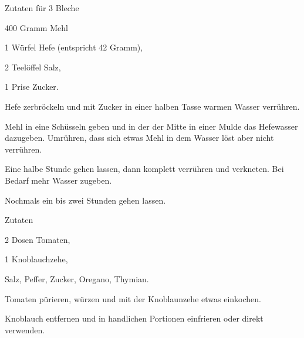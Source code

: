 \startsection[title={Pizza},reference=pizza]

\startsubsection[title=Teig]
\startitemize
\item Zutaten für 3 Bleche
      \startitemize
      \item 400 Gramm Mehl
      \item 1 Würfel Hefe (entspricht 42 Gramm),
      \item 2 Teelöffel Salz,
      \item 1 Prise Zucker.
      \stopitemize
\item Hefe zerbröckeln und mit Zucker in einer halben Tasse warmen
  Wasser verrühren.
\item Mehl in eine Schüsseln geben und in der der Mitte in einer Mulde
  das Hefewasser dazugeben. Umrühren, dass sich etwas Mehl in dem Wasser
  löst aber nicht verrühren.
\item Eine halbe Stunde gehen lassen, dann komplett verrühren und
  verkneten. Bei Bedarf mehr Wasser zugeben.
\item Nochmals ein bis zwei Stunden gehen lassen.
\stopitemize
\stopsubsection

\startsubsection[title=Soße]
\startitemize
\item Zutaten
      \startitemize
      \item 2 Dosen Tomaten,
      \item 1 Knoblauchzehe,
      \item Salz, Peffer, Zucker, Oregano, Thymian.
      \stopitemize
\item Tomaten pürieren, würzen und mit der Knoblaunzehe etwas einkochen.
\item Knoblauch entfernen und in handlichen Portionen einfrieren oder
  direkt verwenden.
\stopitemize
\stopsubsection

\stopsection
